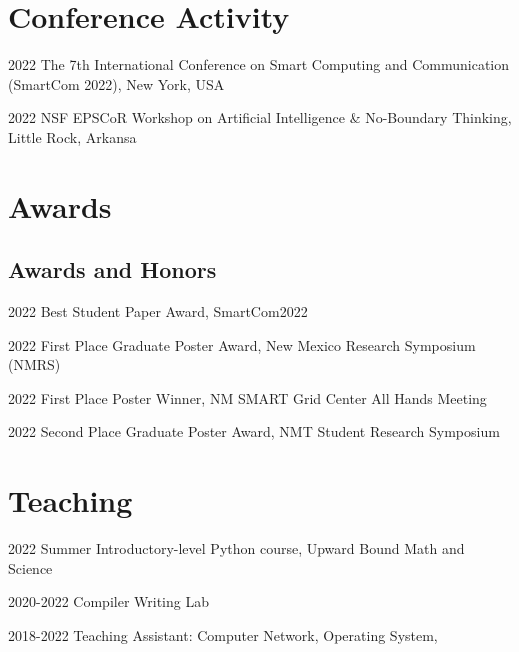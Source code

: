 \documentclass[12pt,letterpaper]{report}
\begin{document}

    \section*{Conference Activity}
    \begin{tablist}
        \item[2022] \tab{}The 7th International Conference on Smart Computing and Communication (SmartCom 2022), New York, USA
        \item[2022] \tab{}NSF EPSCoR Workshop on Artificial Intelligence \& No-Boundary Thinking, Little Rock, Arkansa
    \end{tablist}

    \section*{Awards}
    \subsection*{Awards and Honors}
    \begin{tablist}
        \item[2022] \tab{}Best Student Paper Award, SmartCom2022
        \item[2022] \tab{}First Place Graduate Poster Award, New Mexico Research Symposium (NMRS)
        \item[2022] \tab{}First Place Poster Winner, NM SMART Grid Center All Hands Meeting
        \item[2022] \tab{}Second Place Graduate Poster Award, NMT Student Research Symposium
    \end{tablist}

    \section*{Teaching}
    \begin{tablist}
        \item[2022 Summer] \tab{}Introductory-level Python course, Upward Bound Math and Science
        \item[2020-2022] \tab{}Compiler Writing Lab
        \item[2018-2022] \tab{}Teaching Assistant: Computer Network, Operating System, 
    \end{tablist}
\end{document}
